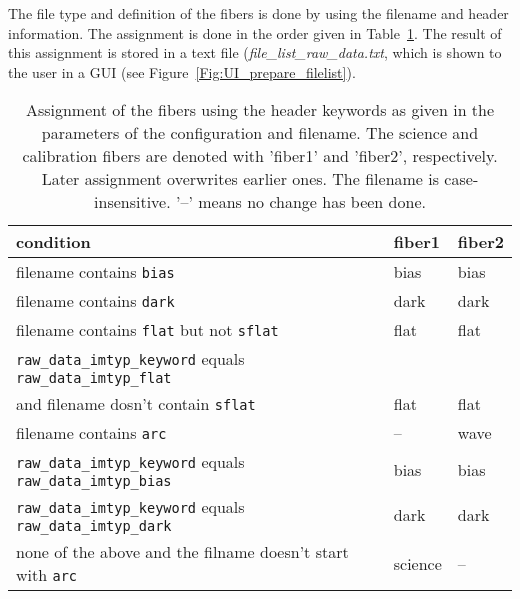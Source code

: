 \documentclass[10pt,a4paper]{article}
\begin{document}
\noindent The file type and definition of the fibers is done by using the filename and header information. The assignment is done in the order given in Table~\ref{Tab:fiber_definition}. The result of this assignment is stored in a text file (\textit{file\_list\_raw\_data.txt}, which is shown to the user in a GUI (see Figure~\ref{Fig:UI_prepare_filelist}). %
\begin{table}
 \caption{Assignment of the fibers using the header keywords as given in the parameters of the configuration and filename. The science and calibration fibers are denoted with 'fiber1' and 'fiber2', respectively. Later assignment overwrites earlier ones. The filename is case-insensitive. '--' means no change has been done.}
 \label{Tab:fiber_definition}
 \begin{tabular}{l l l}
 \small
 condition 															& fiber1 & fiber2 \\
 \hline
 filename contains \verb|bias|										& bias	& bias \\
 filename contains \verb|dark|										& dark	& dark \\
 filename contains \verb|flat| but not \verb|sflat| 				& flat	& flat \\
 \verb|raw_data_imtyp_keyword| equals \verb|raw_data_imtyp_flat| 	&       & \\
 \hspace{1cm} and filename dosn't contain \verb|sflat| 				& flat  & flat \\
 filename contains \verb|arc|						   				& -- 	& wave \\
 \verb|raw_data_imtyp_keyword| equals \verb|raw_data_imtyp_bias| 	& bias	& bias \\
 \verb|raw_data_imtyp_keyword| equals \verb|raw_data_imtyp_dark| 	& dark	& dark \\
 none of the above and the filname doesn't start with \verb|arc|  & science & --   \\
 \end{tabular}
\end{table}
\end{document}

